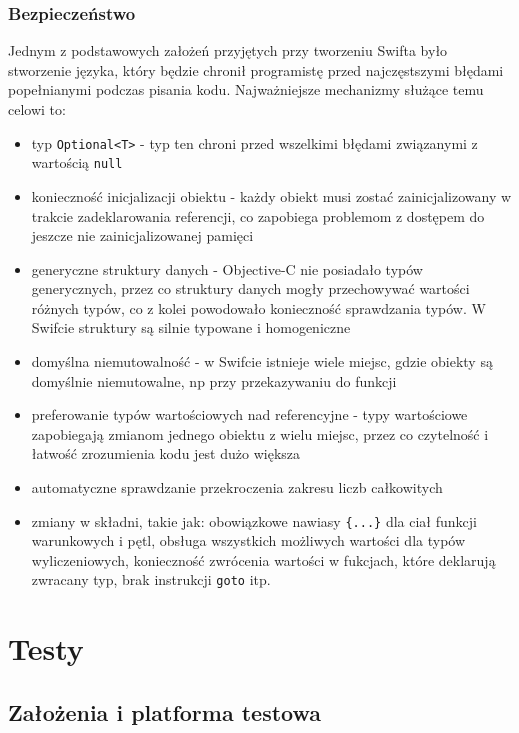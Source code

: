 \documentclass[mgr, shortabstract]{iithesis}
\begin{document}
\subsection{Bezpieczeństwo}

Jednym z podstawowych założeń przyjętych przy tworzeniu Swifta było stworzenie języka, który będzie chronił programistę przed najczęstszymi błędami popełnianymi podczas pisania kodu. Najważniejsze mechanizmy służące temu celowi to:

\begin{itemize}
    \item typ \texttt{Optional<T>} - typ ten chroni przed wszelkimi błędami związanymi z wartością \texttt{null}
    \item konieczność inicjalizacji obiektu - każdy obiekt musi zostać zainicjalizowany w trakcie zadeklarowania referencji, co zapobiega problemom z dostępem do jeszcze nie zainicjalizowanej pamięci
    \item generyczne struktury danych - Objective-C nie posiadało typów generycznych, przez co struktury danych mogły przechowywać wartości różnych typów, co z kolei powodowało konieczność sprawdzania typów. W Swifcie struktury są silnie typowane i homogeniczne
    \item domyślna niemutowalność - w Swifcie istnieje wiele miejsc, gdzie obiekty są domyślnie niemutowalne, np przy przekazywaniu do funkcji
    \item preferowanie typów wartościowych nad referencyjne - typy wartościowe zapobiegają zmianom jednego obiektu z wielu miejsc, przez co czytelność i łatwość zrozumienia kodu jest dużo większa
    \item automatyczne sprawdzanie przekroczenia zakresu liczb całkowitych
    \item zmiany w składni, takie jak: obowiązkowe nawiasy \texttt{\{...\}} dla ciał funkcji warunkowych i pętl, obsługa wszystkich możliwych wartości dla typów wyliczeniowych, konieczność zwrócenia wartości w fukcjach, które deklarują zwracany typ, brak instrukcji \texttt{goto} itp.
\end{itemize}

\chapter{Testy}
\label{ch:testy}

\section{Założenia i platforma testowa}
\end{document}
